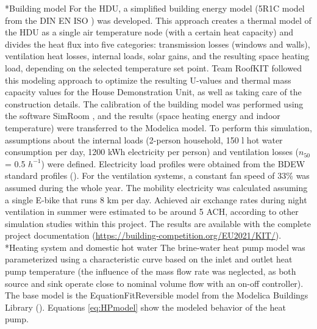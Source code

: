 \documentclass[twocolumn, a4paper,10pt]{article}
\makeatletter
\renewcommand\subsection{\@startsection{subsection}{1}{\z@}{\z@}{\z@}{\normalfont\normalsize\bfseries}}
\renewcommand\subsection{\@startsection{subsection}{1}{\z@}{\z@}{0.1pt}{\normalfont\normalsize\bfseries}}
\makeatother
\begin{document}
\subsection*{Building model}
For the HDU, a simplified building energy model (5R1C model from the DIN EN ISO \citet{DIN13790}) was developed. This approach creates a thermal model of the HDU as a single air temperature node (with a certain heat capacity) and divides the heat flux into five categories: transmission losses (windows and walls), ventilation heat losses, internal loads, solar gains, and the resulting space heating load, depending on the selected temperature set point. Team RoofKIT followed this modeling approach to optimize the resulting U-values and thermal mass capacity values for the House Demonstration Unit, as well as taking care of the construction details. The calibration of the building model was performed using the software SimRoom \citeyear {SimRoom2022}, and the results (space heating energy and indoor temperature) were transferred to the Modelica model. To perform this simulation, assumptions about the internal loads (2-person household, 150 l hot water consumption per day, 1200 kWh electricity per person) and ventilation losses ($n_{50}$ = 0.5 $h^{-1}$) were defined. Electricity load profiles were obtained from the BDEW standard profiles (\citet{BDEW2002}). For the ventilation systems, a constant fan speed of 33\% was assumed during the whole year. The mobility electricity was calculated assuming a single E-bike that runs 8 km per day. Achieved air exchange rates during night ventilation in summer were estimated to be around 5 ACH, according to other simulation studies within this project. The results are available with the complete project documentation (\textcolor{blue}{\url{https://building-competition.org/EU2021/KIT/}}).\\

\subsection*{Heating system and domestic hot water}
The brine-water heat pump model was parameterized using a characteristic curve based on the inlet and outlet heat pump temperature (the influence of the mass flow rate was neglected, as both source and sink operate close to nominal volume flow with an on-off controller). The base model is the EquationFitReversible model from the Modelica Buildings Library (\cite{Wetter2014}). Equations \ref{eq:HPmodel} show the modeled behavior of the heat pump. 
\vspace{-5pt}
\end{document}

